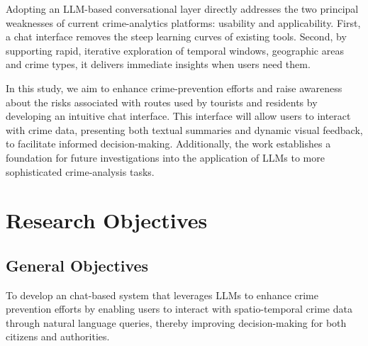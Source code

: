 
Adopting an LLM-based conversational layer directly addresses the two principal weaknesses of current crime-analytics platforms: usability and applicability. First, a chat interface removes the steep learning curves of existing tools. Second, by supporting rapid, iterative exploration of temporal windows, geographic areas and crime types, it delivers immediate insights when users need them.

In this study, we aim to enhance crime-prevention efforts and raise awareness about the risks associated with routes used by tourists and residents by developing an intuitive chat interface. This interface will allow users to interact with crime data, presenting both textual summaries and dynamic visual feedback, to facilitate informed decision-making. Additionally, the work establishes a foundation for future investigations into the application of LLMs to more sophisticated crime-analysis tasks. %

\section{Research Objectives} %

\subsection{General Objectives}
To develop an chat-based system that leverages LLMs to enhance crime prevention efforts by enabling users to interact with spatio-temporal crime data through natural language queries, thereby improving decision-making for both citizens and authorities.

